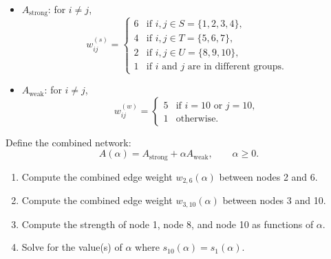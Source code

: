 \documentclass[10pt]{article}
\begin{document}
\begin{enumerate}[{$1.]
\begin{itemize}
\item $A_{\text{strong}}$: for $i\ne j$,
\[
w^{(s)}_{ij}=
\begin{cases}
6 & \text{if } i,j\in S=\{1,2,3,4\},\\
4 & \text{if } i,j\in T=\{5,6,7\},\\
2 & \text{if } i,j\in U=\{8,9,10\},\\
1 & \text{if } i \text{ and } j \text{ are in different groups.}
\end{cases}
\]
\item $A_{\text{weak}}$: for $i\ne j$,
\[
w^{(w)}_{ij}=
\begin{cases}
5 & \text{if } i=10 \text{ or } j=10,\\
1 & \text{otherwise.}
\end{cases}
\]
\end{itemize}

Define the combined network:
\[
A(\alpha)=A_{\text{strong}}+\alpha A_{\text{weak}},\qquad \alpha\ge 0.
\]

\begin{enumerate}[{$a.)$}]
\item Compute the combined edge weight $w_{2,6}(\alpha)$ between nodes 2 and 6.
\vfill

\item Compute the combined edge weight $w_{3,10}(\alpha)$ between nodes 3 and 10.
\vfill

\item Compute the strength of node 1, node 8, and node 10 as functions of $\alpha$.
\vfill

\item Solve for the value(s) of $\alpha$ where $s_{10}(\alpha)=s_1(\alpha)$.
\vfill

\end{enumerate}

\end{enumerate}
\end{document}
